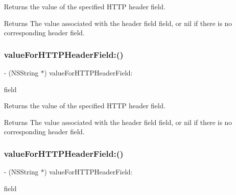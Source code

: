 Returns the value of the specified H\+T\+TP header field.

\begin{DoxyReturn}{Returns}
The value associated with the header field field, or {\ttfamily nil} if there is no corresponding header field. 
\end{DoxyReturn}
\mbox{\label{interface_s_d_web_image_downloader_a35c47c9cf43fbce253153417f5f9f2f4}} 
\subsubsection{\texorpdfstring{value\+For\+H\+T\+T\+P\+Header\+Field\+:()}{valueForHTTPHeaderField:()}\hspace{0.1cm}{\footnotesize\ttfamily [2/3]}}
{\footnotesize\ttfamily -\/ (N\+S\+String $\ast$) value\+For\+H\+T\+T\+P\+Header\+Field\+: \begin{DoxyParamCaption}\item[{(N\+S\+String $\ast$)}]{field }\end{DoxyParamCaption}}

Returns the value of the specified H\+T\+TP header field.

\begin{DoxyReturn}{Returns}
The value associated with the header field field, or {\ttfamily nil} if there is no corresponding header field. 
\end{DoxyReturn}
\mbox{\label{interface_s_d_web_image_downloader_a35c47c9cf43fbce253153417f5f9f2f4}} 
\subsubsection{\texorpdfstring{value\+For\+H\+T\+T\+P\+Header\+Field\+:()}{valueForHTTPHeaderField:()}\hspace{0.1cm}{\footnotesize\ttfamily [3/3]}}
{\footnotesize\ttfamily -\/ (N\+S\+String $\ast$) value\+For\+H\+T\+T\+P\+Header\+Field\+: \begin{DoxyParamCaption}\item[{(N\+S\+String $\ast$)}]{field }\end{DoxyParamCaption}}

